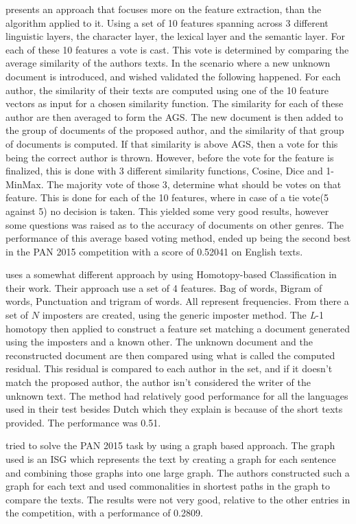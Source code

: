 \cite{castro2015Paper} presents an approach that focuses more on the feature
extraction, than the algorithm applied to it. Using a set of 10 features
spanning across 3 different linguistic layers, the character layer, the lexical
layer and the semantic layer. For each of these 10 features a vote is cast. This
vote is determined by comparing the average similarity of the authors texts. In
the scenario where a new unknown document is introduced, and wished validated
the following happened. For each author, the similarity of their texts are
computed using one of the 10 feature vectors as input for a chosen similarity
function. The similarity for each of these author are then averaged to form
the \gls{AGS}. The new document is then added to the group of documents of the
proposed author, and the similarity of that group of documents is computed.
If that similarity is above \gls{AGS}, then a vote for this being the correct
author is thrown. However, before the vote for the feature is finalized, this
is done with 3 different similarity functions, Cosine, Dice and 1-MinMax. The
majority vote of those 3, determine what should be votes on that feature. This
is done for each of the 10 features, where in case of a tie vote(5 against 5) no
decision is taken. This yielded some very good results, however some questions
was raised as to the accuracy of documents on other genres. The performance of
this average based voting method, ended up being the second best in the PAN 2015
competition with a score of 0.52041 on English texts.

\cite{gutierrez2015} uses a somewhat different approach by using Homotopy-based
Classification in their work. Their approach use a set of 4 features. Bag
of words, Bigram of words, Punctuation and trigram of words. All represent
frequencies. From there a set of $N$ imposters are created, using the generic
imposter method. The \textit{L}-1 homotopy then applied to construct a feature
set matching a document generated using the imposters and a known other. The
unknown document and the reconstructed document are then compared using what is
called the computed residual. This residual is compared to each author in the
set, and if it doesn't match the proposed author, the author isn't considered
the writer of the unknown text. The method had relatively good performance
for all the languages used in their test besides Dutch which they explain is
because of the short texts provided. The performance was 0.51.

\cite{gomezadorno2015} tried to solve the PAN 2015 task by using a graph based
approach. The graph used is an \gls{ISG} which represents the text by creating
a graph for each sentence and combining those graphs into one large graph.
The authors constructed such a graph for each text and used commonalities in
shortest paths in the graph to compare the texts. The results were not very
good, relative to the other entries in the competition, with a performance of
0.2809.

